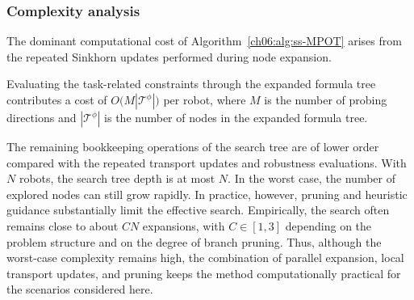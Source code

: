 \subsubsection{Complexity analysis}
\label{ch06:subsubsec:complexity}

The dominant computational cost of
Algorithm~\ref{ch06:alg:ss-MPOT} arises from the repeated Sinkhorn updates
performed during node expansion.
\begin{revision}
Evaluating the task-related constraints through the expanded formula
tree contributes a cost of
$O\big(M|\mathcal{T}^\phi|\big)$ per robot, where $M$ is the number of
probing directions and $|\mathcal{T}^\phi|$ is the number of nodes in
the expanded formula tree.
\end{revision}
The remaining bookkeeping operations of the search tree are of lower
order compared with the repeated transport updates and robustness
evaluations.
With $N$ robots, the search tree depth is at most $N$.
In the worst case, the number of explored nodes can still grow rapidly.
In practice, however, pruning and heuristic guidance substantially limit
the effective search.
Empirically, the search often remains close to about $CN$ expansions,
with $C\in[1,3]$ depending on the problem structure and on the degree of
branch pruning.
Thus, although the worst-case complexity remains high, the combination
of parallel expansion, local transport updates, and pruning keeps the
method computationally practical for the scenarios considered here.

